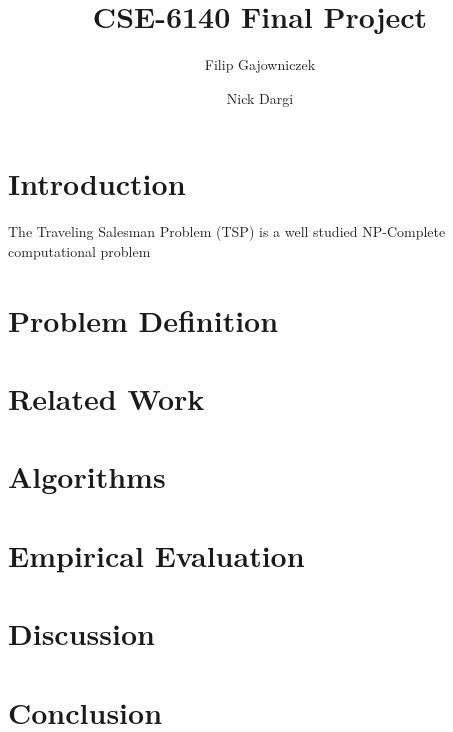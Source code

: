 \documentclass[format=sigconf]{acmart}
\begin{document}
\title{CSE-6140 Final Project}
\author{Filip Gajowniczek}
\author{Nick Dargi}


\section{Introduction}
The Traveling Salesman Problem (TSP) is a well studied NP-Complete computational problem \cite{laporte_1992}
\section*{Problem Definition}
\section*{Related Work}
\section*{Algorithms}
\section*{Empirical Evaluation}
\section*{Discussion}
\section*{Conclusion}


\end{document}

